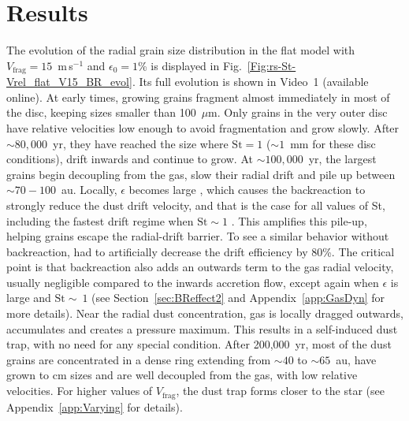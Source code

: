 \documentclass[a4paper,fleqn,usenatbib]{mnras}
\newcommand{\Vrel}{V_\mathrm{rel}}    %
\newcommand{\Vfrag}{V_\mathrm{frag}}  %
\newcommand{\St}{\mathrm{St}}         %
\begin{document}
\section{Results}
\label{sec:Results}

\begin{figure*}
\centering
{}
\caption{Radial grain size distribution in the flat disc for $\Vfrag=15$~m\,s$^{-1}$ and $\epsilon_0=1$\%. Grains grow, decouple from the gas and pile up, resulting in a self-induced dust trap. The blue/red colour code represents the Stokes number St (left), and the brown/green colour code represents the ratio $\Vrel/\Vfrag$ (right). Four snapshots at 50,000, 100,000, 150,000 and 200,000~yr are shown, from top to bottom. Video~1 (available online) shows the full evolution.}
\label{Fig:rs-St-Vrel_flat_V15_BR_evol}
\end{figure*}

The evolution of the radial grain size distribution in the flat model with $\Vfrag=15$~m\,s$^{-1}$ and $\epsilon_0=1$\% is displayed in Fig.~\ref{Fig:rs-St-Vrel_flat_V15_BR_evol}. Its full evolution is shown in Video~1 (available online). At early times, growing grains fragment almost immediately in most of the disc, keeping sizes smaller than 100~$\mu$m. Only grains in the very outer disc have relative velocities low enough to avoid fragmentation and grow slowly. After $\sim80,000$~yr, they have reached the size where $\St=1$ ($\sim1$~mm for these disc conditions), drift inwards and continue to grow. At $\sim100,000$~yr, the largest grains begin decoupling from the gas, slow their radial drift and pile up between $\sim70-100$~au. Locally, $\epsilon$ becomes large%
, which causes the backreaction to strongly reduce the dust drift velocity, and that is the case for all values of St, including the fastest drift regime when $\St\sim1$ \citep{Nakagawa1986}. This amplifies this pile-up, helping grains escape the radial-drift barrier. To see a similar behavior without backreaction, \citet{Birnstiel2010} had to artificially decrease the drift efficiency by 80\%. The critical point is that backreaction also adds an outwards term to the gas radial velocity, usually negligible compared to the inwards accretion flow, except again when $\epsilon$ is large and $\St\sim~1$ (see Section~\ref{sec:BReffect2} and Appendix~\ref{app:GasDyn} for more details). Near the radial dust concentration, gas is locally dragged outwards, accumulates and creates a pressure maximum. This results in a self-induced dust trap, with no need for any special condition. After 200,000~yr, most of the dust grains are concentrated in a dense ring extending from $\sim40$ to $\sim65$~au, have grown to cm sizes and are well decoupled from the gas, with low relative velocities. For higher values of $\Vfrag$, the dust trap forms closer to the star (see Appendix~\ref{app:Varying} for details).
\end{document}
